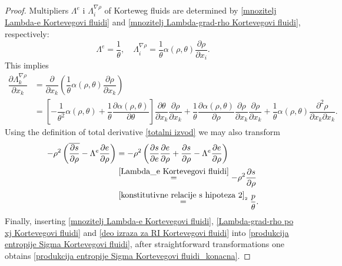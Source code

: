 \documentclass[a4paper,fleqn]{cas-sc}
\theoremstyle{definition}
\begin{document}
\begin{proof}
	Multipliers $\Lambda^e$ i $\Lambda^{\nabla\rho}_i$ of Korteweg fluids are determined by \eqref{mnozitelj Lambda-e Kortevegovi fluidi} and \eqref{mnozitelj Lambda-grad-rho Kortevegovi fluidi}, respectively:
	\begin{equation*}
		\Lambda^e = \dfrac{1}{\theta}, \quad 
		\Lambda^{\nabla\rho}_i = \dfrac{1}{\theta} \alpha(\rho, \theta) 
		\dfrac{\partial \rho}{\partial x_i}. 
	\end{equation*}
	This implies  
	\begin{align} \label{Lambda-grad-rho po xj Kortevegovi fluidi}
		\dfrac{\partial\Lambda^{\nabla\rho}_k}{\partial x_k} & = 
		\dfrac{\partial}{\partial x_k} \left( \dfrac{1}{\theta} \alpha(\rho,\theta) 
		\dfrac{\partial\rho}{\partial x_k} \right) 
		\\
		& = \left[ - \dfrac{1}{\theta^{2}} \alpha(\rho,\theta) 
		+ \dfrac{1}{\theta} \dfrac{\partial \alpha(\rho,\theta)}{\partial\theta} \right] \dfrac{\partial\theta}{\partial x_k} \dfrac{\partial\rho}{\partial x_k} 
		+ \dfrac{1}{\theta} \dfrac{\partial \alpha(\rho,\theta)}{\partial\rho} 
		\dfrac{\partial\rho}{\partial x_k} \dfrac{\partial\rho}{\partial x_k}
		+ \dfrac{1}{\theta} \alpha(\rho,\theta)\dfrac{\partial^2\rho}{\partial x_k\partial x_k}. 
		\nonumber 
	\end{align}
	Using the definition of total derivative \eqref{totalni izvod} we may also transform 
	\begin{align} \label{deo izraza za RI Kortevegovi fluidi}
		- \rho^2 \left( \overline{\dfrac{\partial s}{\partial\rho}} 
		- \Lambda^e \dfrac{\partial e}{\partial\rho} \right) 
		& = - \rho^2 \left( \dfrac{\partial s}{\partial e} \dfrac{\partial e}{\partial\rho} 
		+ \dfrac{\partial s}{\partial\rho} - \Lambda^e \dfrac{\partial e}{\partial\rho} \right) 
		\nonumber \\
		& \overset{\eqref{Lambda_e Kortevegovi fluidi}}{=} 
		- \rho^2 \dfrac{\partial s}{\partial\rho} 
		\\
		& \overset{\eqref{konstitutivne relacije s hipoteza 2}_{2}}{=} \dfrac{p}{\theta}. 
		\nonumber 
	\end{align}
	Finally, inserting \eqref{mnozitelj Lambda-e Kortevegovi fluidi}, \eqref{Lambda-grad-rho po xj Kortevegovi fluidi} and \eqref{deo izraza za RI Kortevegovi fluidi} into \eqref{produkcija entropije Sigma Kortevegovi fluidi}, after straightforward transformations one obtains \eqref{produkcija entropije Sigma Kortevegovi fluidi_konacna}. 
\end{proof}
\end{document}
